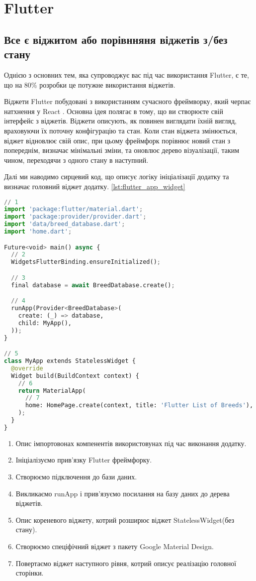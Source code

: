 \chapter{Flutter}
\label{ch3}


\section{Все є віджитом або порівнняня віджетів з/без стану}
\label{section.3.1}
Однією з основних тем, яка супроводжує вас під час використання Flutter, є те, що на 80\% розробки це потужне використання віджетів.

Віджети Flutter побудовані з використанням сучасного фреймворку, який черпає натхнення у React \cite{flutter_widgets_intro}.
Основна ідея полягає в тому, що ви створюєте свій інтерфейс з віджетів.
Віджети описують, як повинен виглядати їхній вигляд, враховуючи їх поточну конфігурацію та стан.
Коли стан віджета змінюється, віджет відновлює свій опис, при цьому фреймфорк порівнює новий стан з попереднім,
визначає мінімальні зміни, та оновлює дерево візуалізації, таким чином, переходячи з одного стану в наступний.

Далі ми наводимо сирцевий код, що описує логіку ініціалізації додатку та визначає головний віджет додатку. \ref{lst:flutter_app_widget}

\begin{lstlisting}[style=light, language=Python,label={lst:flutter_app_widget},caption=Flutter StatelessWidget]
// 1
import 'package:flutter/material.dart';
import 'package:provider/provider.dart';
import 'data/breed_database.dart';
import 'home.dart';

Future<void> main() async {
  // 2
  WidgetsFlutterBinding.ensureInitialized();

  // 3
  final database = await BreedDatabase.create();

  // 4
  runApp(Provider<BreedDatabase>(
    create: (_) => database,
    child: MyApp(),
  ));
}

// 5
class MyApp extends StatelessWidget {
  @override
  Widget build(BuildContext context) {
    // 6
    return MaterialApp(
      // 7
      home: HomePage.create(context, title: 'Flutter List of Breeds'),
    );
  }
}
\end{lstlisting}

\begin{enumerate}
    \item Опис імпортовонах компенентів використовунах під час виконання додатку.
    \item Ініціалізуємо прив'язку Flutter фреймфорку.
    \item Створюємо підключення до бази даних.
    \item Викликаємо runApp і прив'язуємо посилання на базу даних до дерева віджетів.
    \item Опис кореневого віджету, котрий розширює віджет StatelessWidget(без стану).
    \item Створюємо спеціфічний віджет з пакету Google Material Design.
    \item Повертаємо віджет наступного рівня, котрий описує реалізацію головної сторінки.
\end{enumerate}

